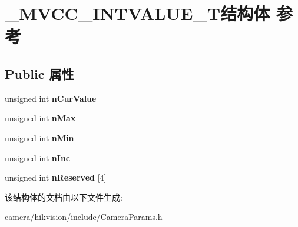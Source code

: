\hypertarget{struct___m_v_c_c___i_n_t_v_a_l_u_e___t}{}\section{\+\_\+\+M\+V\+C\+C\+\_\+\+I\+N\+T\+V\+A\+L\+U\+E\+\_\+\+T结构体 参考}
\label{struct___m_v_c_c___i_n_t_v_a_l_u_e___t}
\subsection*{Public 属性}
\begin{DoxyCompactItemize}
\item 
\mbox{\label{struct___m_v_c_c___i_n_t_v_a_l_u_e___t_ab3303fadfa68e29365e0559efac6207c}} 
unsigned int {\bfseries n\+Cur\+Value}
\item 
\mbox{\label{struct___m_v_c_c___i_n_t_v_a_l_u_e___t_ad6df80a79082b9a8b4e6bc1610b0b7f4}} 
unsigned int {\bfseries n\+Max}
\item 
\mbox{\label{struct___m_v_c_c___i_n_t_v_a_l_u_e___t_aeb53231be87ac77e296a0b2d9a569834}} 
unsigned int {\bfseries n\+Min}
\item 
\mbox{\label{struct___m_v_c_c___i_n_t_v_a_l_u_e___t_ab532f774ef137b95769dd1a90c01e55c}} 
unsigned int {\bfseries n\+Inc}
\item 
\mbox{\label{struct___m_v_c_c___i_n_t_v_a_l_u_e___t_a873d765ce2257de9476450054e5d1af0}} 
unsigned int {\bfseries n\+Reserved} \mbox{[}4\mbox{]}
\end{DoxyCompactItemize}


该结构体的文档由以下文件生成\+:\begin{DoxyCompactItemize}
\item 
camera/hikvision/include/Camera\+Params.\+h\end{DoxyCompactItemize}
